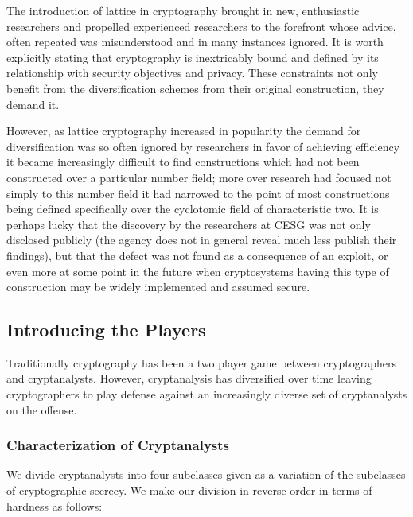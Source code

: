 The introduction of lattice in cryptography brought in new,
enthusiastic researchers and propelled experienced researchers to the
forefront whose advice, often repeated was misunderstood and in many
instances ignored.
It is worth explicitly stating that cryptography is inextricably bound and
defined by its relationship with security objectives and privacy. These
constraints not only benefit from the diversification schemes from
their original construction, they demand it.

However, as lattice cryptography increased in popularity the demand
for diversification was so often ignored by researchers in favor of
achieving efficiency it became increasingly difficult to find
constructions which had not been constructed over a particular number
field; more over research had focused not simply to this number field
it had narrowed to the point of most constructions being defined
specifically over the cyclotomic field of characteristic two.
It is perhaps lucky that the discovery by the researchers at CESG was
not only disclosed publicly (the agency does not in general reveal much
less publish their findings), but that the defect was not found as a
consequence of an exploit, or even more at some point in the future
when cryptosystems having this type of construction may be widely
implemented and assumed secure.

\subsection{Introducing the Players}

Traditionally cryptography has been a two player game between
cryptographers and cryptanalysts. However, cryptanalysis has
diversified over time leaving cryptographers to play defense against an
increasingly diverse set of cryptanalysts on the offense.

\subsubsection{Characterization of Cryptanalysts}

We divide cryptanalysts into four subclasses given as a variation of
the subclasses of cryptographic secrecy.
We make our division in reverse order in terms of hardness as
follows:

